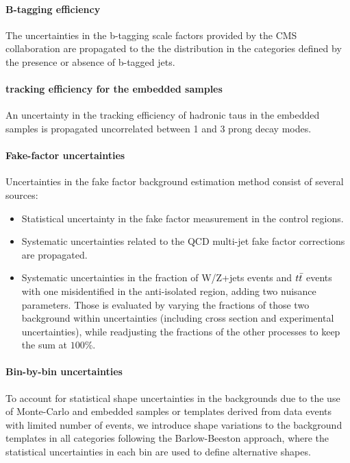 \paragraph{B-tagging efficiency} The uncertainties in the b-tagging scale factors provided by the CMS collaboration are propagated to the the \mttot distribution in the categories defined by the presence or absence of b-tagged jets.

\paragraph{\tauh tracking efficiency for the embedded samples} An uncertainty in the tracking efficiency of hadronic taus in the embedded samples is propagated uncorrelated between 1 and 3 prong decay modes.

\paragraph{Fake-factor uncertainties} Uncertainties in the fake factor background estimation method consist of several sources:
\begin{itemize}
    \item Statistical uncertainty in the fake factor measurement in the control regions.
    \item Systematic uncertainties related to the QCD multi-jet fake factor corrections are propagated.
    \item Systematic uncertainties in the fraction of W/Z+jets events and $t\Bar{t}$ events with one misidentified \tauh in the anti-isolated region, adding two nuisance parameters. Those is evaluated by varying the fractions of those two background within uncertainties (including cross section and experimental uncertainties), while readjusting the fractions of the other processes to keep the sum at $100\%$.
\end{itemize}

\paragraph{Bin-by-bin uncertainties} To account for statistical shape uncertainties in the backgrounds due to the use of Monte-Carlo and embedded samples or templates derived from data events with limited number of events, we introduce shape variations to the background templates in all categories following the Barlow-Beeston approach, where the statistical uncertainties in each bin are used to define alternative shapes.


